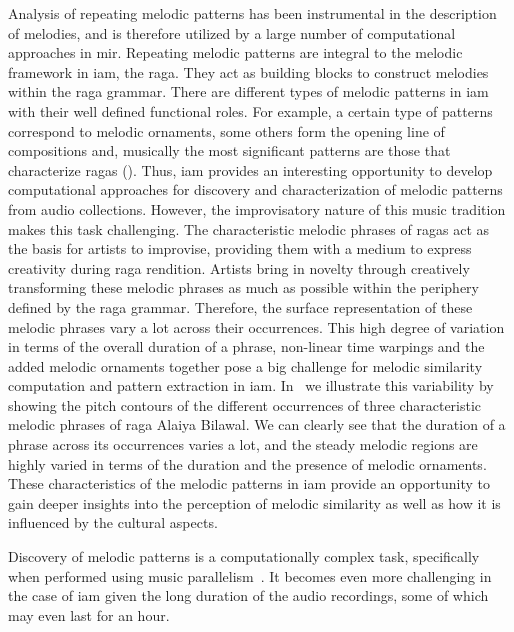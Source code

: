 Analysis of repeating melodic patterns has been instrumental in the description of melodies, and is therefore utilized by a large number of computational approaches in \gls{mir}. Repeating melodic patterns are integral to the melodic framework in \gls{iam}, the \gls{raga}. They act as building blocks to construct melodies within the \gls{raga} grammar. There are different types of melodic patterns in \gls{iam} with their well defined functional roles. For example, a certain type of patterns correspond to melodic ornaments, some others form the opening line of compositions and, musically the most significant patterns are those that characterize \glspl{raga} (). Thus, \gls{iam} provides an interesting opportunity to develop computational approaches for discovery and characterization of melodic patterns from audio collections. However, the improvisatory nature of this music tradition makes this task challenging. The characteristic melodic phrases of \glspl{raga} act as the basis for artists to improvise, providing them with a medium to express creativity during \gls{raga} rendition. Artists bring in novelty through creatively transforming these melodic phrases as much as possible within the periphery defined by the \gls{raga} grammar. Therefore, the surface representation of these melodic phrases vary a lot across their occurrences. This high degree of variation in terms of the overall duration of a phrase, non-linear time warpings and the added melodic ornaments together pose a big challenge for melodic similarity computation and pattern extraction in \gls{iam}. In~ we illustrate this variability by showing the pitch contours of the different occurrences of three characteristic melodic phrases of \gls{raga} Alaiya Bilawal. We can clearly see that the duration of a phrase across its occurrences varies a lot, and the steady melodic regions are highly varied in terms of the duration and the presence of melodic ornaments. These characteristics of the melodic patterns in \gls{iam} provide an opportunity to gain deeper insights into the perception of melodic similarity as well as how it is influenced by the cultural aspects. 

Discovery of melodic patterns is a computationally complex task, specifically when performed using music parallelism~\citep{Cambouropoulos2006}. It becomes even more challenging in the case of \gls{iam} given the long duration of the audio recordings, some of which may even last for an hour.

